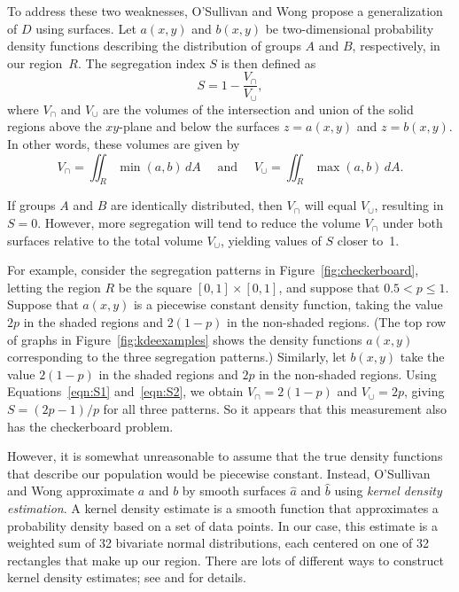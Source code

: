 \documentclass{article}
\theoremstyle{theorem}
\theoremstyle{definition}
\begin{document}
To address these two weaknesses, O'Sullivan and Wong \cite{osullivanwong07} propose a generalization of $D$ using surfaces. Let $a(x,y)$ and $b(x,y)$ be two-dimensional probability density functions describing the distribution of groups $A$ and $B$, respectively, in our region~$R$. The segregation index $S$ is then defined as
\begin{equation}\label{eqn:S1}
  S = 1 - \frac{V_\cap}{V_\cup},
\end{equation}
where $V_\cap$ and $V_\cup$ are the volumes of the intersection and union of the solid regions above the $xy$-plane and below the surfaces $z = a(x,y)$ and $z=b(x,y)$. In other words, these volumes are given by
\begin{equation}\label{eqn:S2}
  V_\cap = \iint_R \min(a, b) \, dA \quad \text{ and } \quad V_\cup = \iint_R \max(a,b) \, dA.
\end{equation}

If groups $A$ and $B$ are identically distributed, then $V_\cap$ will equal $V_\cup$, resulting in $S = 0$. However, more segregation will tend to reduce the volume $V_\cap$ under both surfaces relative to the total volume $V_\cup$, yielding values of $S$ closer to~1.

For example, consider the segregation patterns in Figure~\ref{fig:checkerboard}, letting the region $R$ be the square $[0,1] \times [0,1]$, and suppose that $0.5 < p \leq 1$. Suppose that $a(x,y)$ is a piecewise constant density function, taking the value $2p$ in the shaded regions and $2(1-p)$ in the non-shaded regions. (The top row of graphs in Figure~\ref{fig:kdeexamples} shows the density functions $a(x,y)$ corresponding to the three segregation patterns.) Similarly, let $b(x,y)$ take the value $2(1-p)$ in the shaded regions and $2p$ in the non-shaded regions. Using Equations~\ref{eqn:S1} and~\ref{eqn:S2}, we obtain $V_\cap = 2(1-p)$ and $V_\cup = 2p$, giving $S = (2p-1)/p$ for all three patterns. So it appears that this measurement also has the checkerboard problem.

However, it is somewhat unreasonable to assume that the true density functions that describe our population would be piecewise constant. Instead, O'Sullivan and Wong approximate $a$ and $b$ by smooth surfaces $\hat{a}$ and $\hat{b}$ using \textit{kernel density estimation}. A kernel density estimate is a smooth function that approximates a probability density based on a set of data points. \cite{wandjones11} In our case, this estimate is a weighted sum of 32 bivariate normal distributions, each centered on one of 32 rectangles that make up our region. There are lots of different ways to construct kernel density estimates; see \cite{wandjones11} and \cite{dengwickham11} for details.
\end{document}
